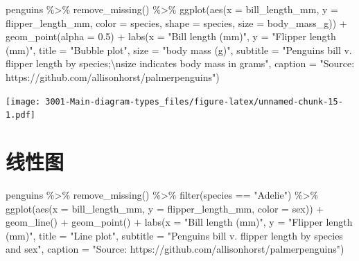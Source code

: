 \documentclass[
]{book}
\newenvironment{Shaded}{\begin{snugshade}}{\end{snugshade}}
\newcommand{\AttributeTok}[1]{\textcolor[rgb]{0.77,0.63,0.00}{#1}}
\newcommand{\FloatTok}[1]{\textcolor[rgb]{0.00,0.00,0.81}{#1}}
\newcommand{\FunctionTok}[1]{\textcolor[rgb]{0.00,0.00,0.00}{#1}}
\newcommand{\NormalTok}[1]{#1}
\newcommand{\SpecialCharTok}[1]{\textcolor[rgb]{0.00,0.00,0.00}{#1}}
\newcommand{\StringTok}[1]{\textcolor[rgb]{0.31,0.60,0.02}{#1}}
\begin{document}
\begin{Shaded}
\begin{Highlighting}[]
\NormalTok{penguins }\SpecialCharTok{\%\textgreater{}\%}
    \FunctionTok{remove\_missing}\NormalTok{() }\SpecialCharTok{\%\textgreater{}\%}
    \FunctionTok{ggplot}\NormalTok{(}\FunctionTok{aes}\NormalTok{(}\AttributeTok{x =}\NormalTok{ bill\_length\_mm, }\AttributeTok{y =}\NormalTok{ flipper\_length\_mm,}
              \AttributeTok{color =}\NormalTok{ species, }\AttributeTok{shape =}\NormalTok{ species, }\AttributeTok{size =}\NormalTok{ body\_mass\_g)) }\SpecialCharTok{+}
    \FunctionTok{geom\_point}\NormalTok{(}\AttributeTok{alpha =} \FloatTok{0.5}\NormalTok{) }\SpecialCharTok{+}
    \FunctionTok{labs}\NormalTok{(}\AttributeTok{x =} \StringTok{"Bill length (mm)"}\NormalTok{, }
         \AttributeTok{y =} \StringTok{"Flipper length (mm)"}\NormalTok{,}
        \AttributeTok{title =} \StringTok{"Bubble plot"}\NormalTok{, }
        \AttributeTok{size =} \StringTok{"body mass (g)"}\NormalTok{,}
        \AttributeTok{subtitle =} \StringTok{"Penguins bill v. flipper length by species;}\SpecialCharTok{\textbackslash{}n}\StringTok{size indicates body mass in grams"}\NormalTok{,}
        \AttributeTok{caption =} \StringTok{"Source: https://github.com/allisonhorst/palmerpenguins"}\NormalTok{)}
\end{Highlighting}
\end{Shaded}

\texttt{[image: 3001-Main-diagram-types\_files/figure-latex/unnamed-chunk-15-1.pdf]}

\hypertarget{ux7ebfux6027ux56fe}{%
\section{线性图}\label{ux7ebfux6027ux56fe}}

\begin{Shaded}
\begin{Highlighting}[]
\NormalTok{penguins }\SpecialCharTok{\%\textgreater{}\%}
    \FunctionTok{remove\_missing}\NormalTok{() }\SpecialCharTok{\%\textgreater{}\%}
    \FunctionTok{filter}\NormalTok{(species }\SpecialCharTok{==} \StringTok{"Adelie"}\NormalTok{) }\SpecialCharTok{\%\textgreater{}\%}
    \FunctionTok{ggplot}\NormalTok{(}\FunctionTok{aes}\NormalTok{(}\AttributeTok{x =}\NormalTok{ bill\_length\_mm, }\AttributeTok{y =}\NormalTok{ flipper\_length\_mm,}
               \AttributeTok{color =}\NormalTok{ sex)) }\SpecialCharTok{+}
    \FunctionTok{geom\_line}\NormalTok{() }\SpecialCharTok{+}
    \FunctionTok{geom\_point}\NormalTok{() }\SpecialCharTok{+}
    \FunctionTok{labs}\NormalTok{(}\AttributeTok{x =} \StringTok{"Bill length (mm)"}\NormalTok{, }
         \AttributeTok{y =} \StringTok{"Flipper length (mm)"}\NormalTok{,}
        \AttributeTok{title =} \StringTok{"Line plot"}\NormalTok{, }
        \AttributeTok{subtitle =} \StringTok{"Penguins bill v. flipper length by species and sex"}\NormalTok{,}
        \AttributeTok{caption =} \StringTok{"Source: https://github.com/allisonhorst/palmerpenguins"}\NormalTok{)}
\end{Highlighting}
\end{Shaded}
\end{document}
